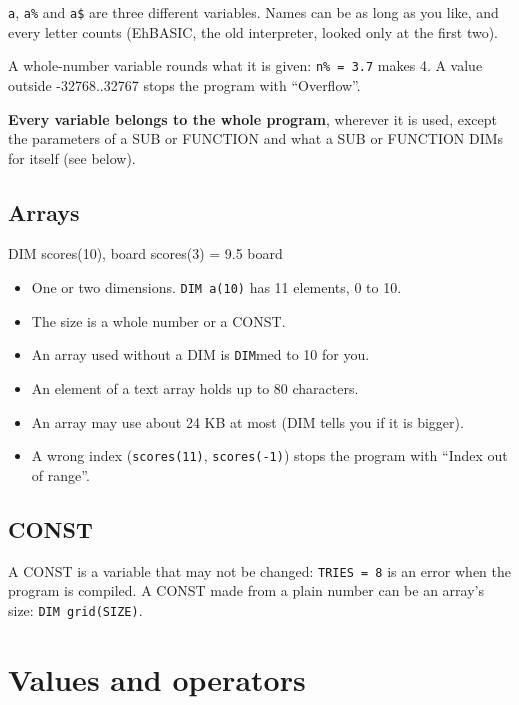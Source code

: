 \verb|a|, \verb|a%| and \verb|a$| are three different variables. Names can be as long
as you like, and every letter counts (EhBASIC, the old interpreter, looked
only at the first two).

A whole-number variable rounds what it is given: \texttt{n\% = 3.7} makes 4. A
value outside -32768..32767 stops the program with ``Overflow''.

\textbf{Every variable belongs to the whole program}, wherever it is used,
except the parameters of a SUB or FUNCTION and what a SUB or FUNCTION
DIMs for itself (see below).

\subsection{Arrays}

\begin{type}
DIM scores(10), board%
scores(3) = 9.5
board%
\end{type}

\begin{itemize}
\item One or two dimensions. \texttt{DIM a(10)} has 11 elements, 0 to 10.
\item The size is a whole number or a CONST.
\item An array used without a DIM is \verb|DIM|med to 10 for you.
\item An element of a text array holds up to 80 characters.
\item An array may use about 24 KB at most (DIM tells you if it is bigger).
\item A wrong index (\verb|scores(11)|, \verb|scores(-1)|) stops the program with ``Index out of range''.
\end{itemize}

\subsection{CONST}


A CONST is a variable that may not be changed: \texttt{TRIES = 8} is an error
when the program is compiled. A CONST made from a plain number can be
an array's size: \texttt{DIM grid(SIZE)}.

\section{Values and operators}


